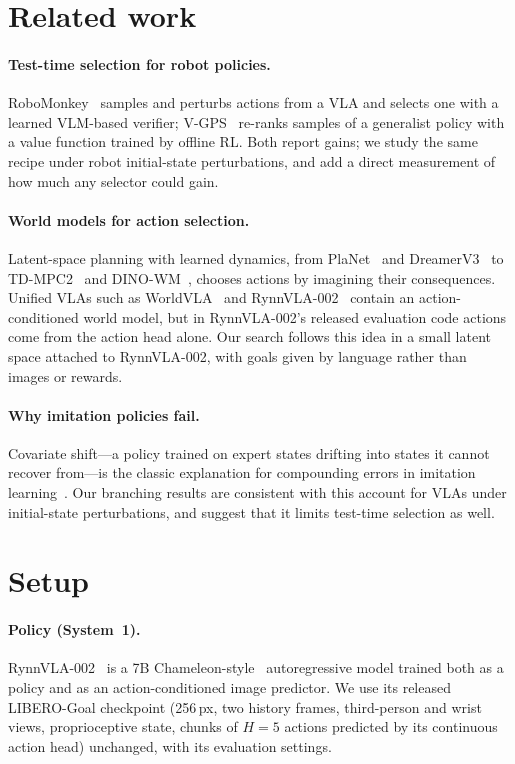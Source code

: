 \documentclass[11pt]{article}
\begin{document}
\section{Related work}
\label{sec:related}

\paragraph{Test-time selection for robot policies.} RoboMonkey~\citep{kwok2025robomonkey} samples and perturbs actions from a VLA and selects one with a learned VLM-based verifier; V-GPS~\citep{nakamoto2024vgps} re-ranks samples of a generalist policy with a value function trained by offline RL. Both report gains; we study the same recipe under robot initial-state perturbations, and add a direct measurement of how much any selector could gain.

\paragraph{World models for action selection.} Latent-space planning with learned dynamics, from PlaNet~\citep{hafner2018planet} and DreamerV3~\citep{hafner2023dreamerv3} to TD-MPC2~\citep{hansen2023tdmpc2} and DINO-WM~\citep{zhou2024dinowm}, chooses actions by imagining their consequences. Unified VLAs such as WorldVLA~\citep{cen2025worldvla} and RynnVLA-002~\citep{cen2025rynnvla002} contain an action-conditioned world model, but in RynnVLA-002's released evaluation code actions come from the action head alone. Our search follows this idea in a small latent space attached to RynnVLA-002, with goals given by language rather than images or rewards.

\paragraph{Why imitation policies fail.} Covariate shift---a policy trained on expert states drifting into states it cannot recover from---is the classic explanation for compounding errors in imitation learning~\citep{ross2011dagger}. Our branching results are consistent with this account for VLAs under initial-state perturbations, and suggest that it limits test-time selection as well.

\section{Setup}
\label{sec:setup}

\paragraph{Policy (System~1).} RynnVLA-002~\citep{cen2025rynnvla002} is a 7B Chameleon-style~\citep{chameleon2024} autoregressive model trained both as a policy and as an action-conditioned image predictor. We use its released LIBERO-Goal checkpoint (256\,px, two history frames, third-person and wrist views, proprioceptive state, chunks of $H{=}5$ actions predicted by its continuous action head) unchanged, with its evaluation settings.
\end{document}
